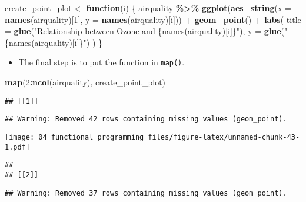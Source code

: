 \documentclass[
]{book}
\newenvironment{Shaded}{\begin{snugshade}}{\end{snugshade}}
\newcommand{\ControlFlowTok}[1]{\textcolor[rgb]{0.13,0.29,0.53}{\textbf{#1}}}
\newcommand{\DataTypeTok}[1]{\textcolor[rgb]{0.13,0.29,0.53}{#1}}
\newcommand{\DecValTok}[1]{\textcolor[rgb]{0.00,0.00,0.81}{#1}}
\newcommand{\KeywordTok}[1]{\textcolor[rgb]{0.13,0.29,0.53}{\textbf{#1}}}
\newcommand{\NormalTok}[1]{#1}
\newcommand{\OperatorTok}[1]{\textcolor[rgb]{0.81,0.36,0.00}{\textbf{#1}}}
\newcommand{\StringTok}[1]{\textcolor[rgb]{0.31,0.60,0.02}{#1}}
\providecommand{\tightlist}{%
  \setlength{\itemsep}{0pt}\setlength{\parskip}{0pt}}
\begin{document}
\begin{Shaded}
\begin{Highlighting}[]
\NormalTok{create\_point\_plot \textless{}{-}}\StringTok{ }\ControlFlowTok{function}\NormalTok{(i) \{}
\NormalTok{  airquality }\OperatorTok{\%\textgreater{}\%}
\StringTok{    }\KeywordTok{ggplot}\NormalTok{(}\KeywordTok{aes\_string}\NormalTok{(}\DataTypeTok{x =} \KeywordTok{names}\NormalTok{(airquality)[}\DecValTok{1}\NormalTok{], }\DataTypeTok{y =} \KeywordTok{names}\NormalTok{(airquality)[i])) }\OperatorTok{+}
\StringTok{    }\KeywordTok{geom\_point}\NormalTok{() }\OperatorTok{+}
\StringTok{    }\KeywordTok{labs}\NormalTok{(}
      \DataTypeTok{title =} \KeywordTok{glue}\NormalTok{(}\StringTok{"Relationship between Ozone and \{names(airquality)[i]\}"}\NormalTok{),}
      \DataTypeTok{y =} \KeywordTok{glue}\NormalTok{(}\StringTok{"\{names(airquality)[i]\}"}\NormalTok{)}
\NormalTok{    )}
\NormalTok{\}}
\end{Highlighting}
\end{Shaded}

\begin{itemize}
\tightlist
\item
  The final step is to put the function in \texttt{map()}.
\end{itemize}

\begin{Shaded}
\begin{Highlighting}[]
\KeywordTok{map}\NormalTok{(}\DecValTok{2}\OperatorTok{:}\KeywordTok{ncol}\NormalTok{(airquality), create\_point\_plot)}
\end{Highlighting}
\end{Shaded}

\begin{verbatim}
## [[1]]
\end{verbatim}

\begin{verbatim}
## Warning: Removed 42 rows containing missing values (geom_point).
\end{verbatim}

\texttt{[image: 04\_functional\_programming\_files/figure-latex/unnamed-chunk-43-1.pdf]}

\begin{verbatim}
## 
## [[2]]
\end{verbatim}

\begin{verbatim}
## Warning: Removed 37 rows containing missing values (geom_point).
\end{verbatim}
\end{document}
